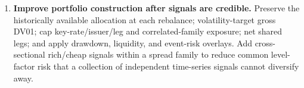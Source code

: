 \begin{enumerate}
\item \textbf{Improve portfolio construction after signals are credible.} Preserve the
historically available allocation at each rebalance; volatility-target gross DV01;
cap key-rate/issuer/leg and correlated-family exposure; net shared legs; and apply
drawdown, liquidity, and event-risk overlays. Add cross-sectional rich/cheap
signals within a spread family to reduce common level-factor risk that a collection
of independent time-series signals cannot diversify away.
\end{enumerate}
